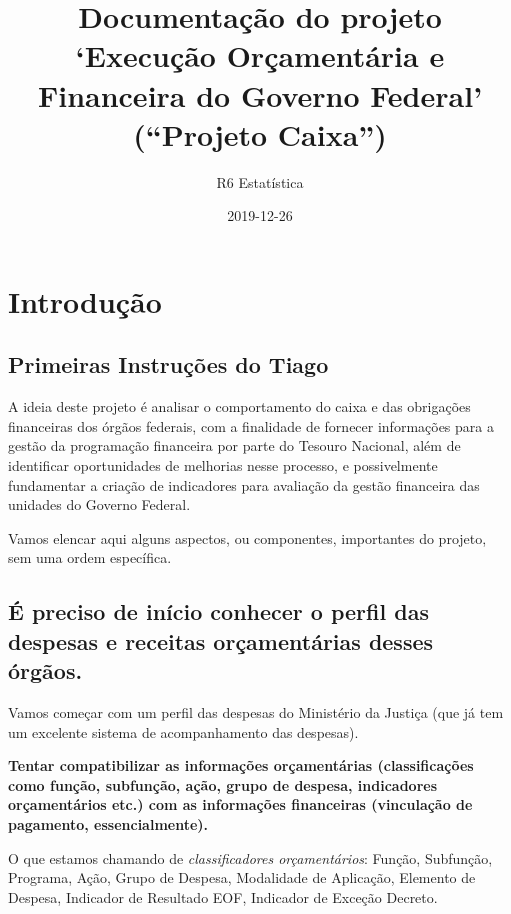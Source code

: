 \documentclass[]{book}
\title{Documentação do projeto `Execução Orçamentária e Financeira do Governo Federal' (``Projeto Caixa'')}
\author{R6 Estatística}
\date{2019-12-26}
\begin{document}
\maketitle

{
\setcounter{tocdepth}{1}
\tableofcontents
}
\hypertarget{introduuxe7uxe3o}{%
\chapter{Introdução}\label{introduuxe7uxe3o}}

\hypertarget{primeiras-instruuxe7uxf5es-do-tiago}{%
\section{Primeiras Instruções do Tiago}\label{primeiras-instruuxe7uxf5es-do-tiago}}

A ideia deste projeto é analisar o comportamento do caixa e das obrigações financeiras dos órgãos federais, com a finalidade de fornecer informações para a gestão da programação financeira por parte do Tesouro Nacional, além de identificar oportunidades de melhorias nesse processo, e possivelmente fundamentar a criação de indicadores para avaliação da gestão financeira das unidades do Governo Federal.

Vamos elencar aqui alguns aspectos, ou componentes, importantes do projeto, sem uma ordem específica.

\hypertarget{uxe9-preciso-de-inuxedcio-conhecer-o-perfil-das-despesas-e-receitas-oruxe7amentuxe1rias-desses-uxf3rguxe3os.}{%
\section{É preciso de início conhecer o perfil das despesas e receitas orçamentárias desses órgãos.}\label{uxe9-preciso-de-inuxedcio-conhecer-o-perfil-das-despesas-e-receitas-oruxe7amentuxe1rias-desses-uxf3rguxe3os.}}

Vamos começar com um perfil das despesas do Ministério da Justiça (que já tem um excelente sistema de acompanhamento das despesas).

\textbf{Tentar compatibilizar as informações orçamentárias (classificações como função, subfunção, ação, grupo de despesa, indicadores orçamentários etc.) com as informações financeiras (vinculação de pagamento, essencialmente).}

O que estamos chamando de \emph{classificadores orçamentários}: Função, Subfunção, Programa, Ação, Grupo de Despesa, Modalidade de Aplicação, Elemento de Despesa, Indicador de Resultado EOF, Indicador de Exceção Decreto.
\end{document}
